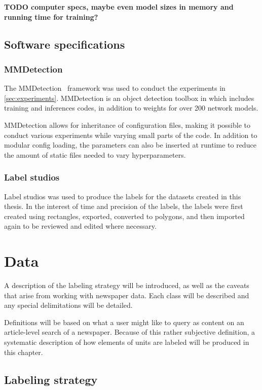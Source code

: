 \documentclass[oneside, english, bibtex]{kththesis}
\begin{document}
\textbf{TODO computer specs, maybe even model sizes in memory and running time for training?}

\subsection{Software specifications}

\subsubsection{MMDetection}
The MMDetection~\cite{DBLP:journals/corr/abs-1906-07155} framework was used to conduct the experiments in \autoref{sec:experiments}.
MMDetection is an object detection toolbox in which includes training and inferences codes, in addition to weights for over 200 network models.

MMDetection allows for inheritance of configuration files, making it possible to conduct various experiments while varying small parts of the code.
In addition to modular config loading, the parameters can also be inserted at runtime to reduce the amount of static files needed to vary hyperparameters.

\subsubsection{Label studios}
Label studios was used to produce the labels for the datasets created in this thesis. In the interest of time and precision of the labels, the labels were first created using rectangles, exported, converted to polygons, and then imported again to be reviewed and edited where necessary. 


\section{Data}

A description of the labeling strategy will be introduced, as well as the caveats that arise from working with newspaper data.
Each class will be described and any special delimitations will be detailed.

Definitions will be based on what a user might like to query as content on an article-level search of a newspaper.
Because of this rather subjective definition, a systematic description of how elements of units are labeled will be produced in this chapter.

\subsection{Labeling strategy}
\label{subsec:labelingstrat}
\end{document}
